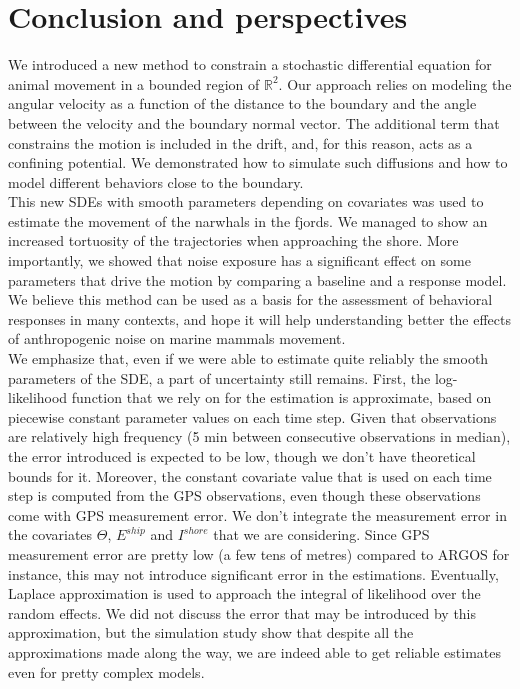 \documentclass[aoas]{imsart}
\theoremstyle{definition}
\theoremstyle{remark}
\theoremstyle{remark}
\newcommand {\R}{\mathbb{R}}
\newcommand {\1}{\mathbb{1}}
\begin{document}
\section{Conclusion and perspectives}


We introduced a new method to constrain a stochastic differential equation for animal movement in a bounded region of $\R^2$. Our approach relies on modeling the angular velocity as a function of the distance to the boundary and the angle between the velocity and the boundary normal vector. The additional term that constrains the motion is included in the drift, and, for this reason, acts as a confining potential.
We demonstrated how to simulate such diffusions and how to model different behaviors close to the boundary.\\

This new SDEs with smooth parameters depending on covariates was used to estimate the movement of the narwhals in the fjords. We managed to show an increased tortuosity of the trajectories when approaching the shore. More importantly, we showed that noise exposure has a significant effect on some parameters that drive the motion by comparing a baseline and a response model. We believe this method can be used as a basis for the assessment of behavioral responses in many contexts, and hope it will help understanding better the effects of anthropogenic noise on marine mammals movement.\\

We emphasize that, even if we were able to estimate quite reliably the smooth parameters of the SDE, a part of uncertainty still remains. First, the log-likelihood function that we rely on for the estimation is approximate, based on piecewise constant parameter values on each time step. Given that observations are relatively high frequency (5 min between consecutive observations in median), the error introduced is expected to be low, though we don't have theoretical bounds for it. Moreover, the constant covariate value that is used on each time step is computed from the GPS observations, even though these observations come with GPS measurement error. We don't integrate the measurement error in the covariates $\Theta$, $E^{ship}$ and $I^{shore}$ that we are considering. Since GPS measurement error are pretty low (a few tens of metres) compared to ARGOS for instance, this may not introduce significant error in the estimations. Eventually, Laplace approximation is used to approach the integral of likelihood over the random effects. We did not discuss the error that may be introduced by this approximation, but the simulation study show that despite all the approximations made along the way, we are indeed able to get reliable estimates even for pretty complex models.\\
\end{document}
